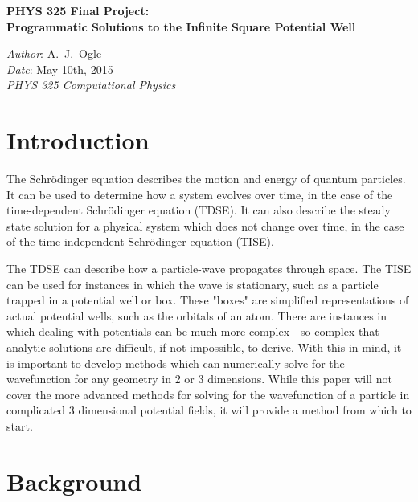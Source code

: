 \documentclass[12pt]{article}                  %
\begin{document}

\begin{center}
{\large \bf{PHYS 325 Final Project:\\
Programmatic Solutions to the Infinite Square Potential Well}}\\
\end{center}
\begin{flushleft}                              %
{\em Author}: A.~J.~Ogle \\                    %
{\em Date}: May 10th, 2015\\
{\em PHYS 325 Computational Physics}\\
\end{flushleft}

\section{Introduction}
	The Schrödinger equation describes the motion and energy of quantum particles. It can be used to determine how a system evolves over time, in the case of the time-dependent Schrödinger equation (TDSE). It can also describe the steady state solution for a physical system which does not change over time, in the case of the time-independent Schrödinger equation (TISE). 
	
The TDSE can describe how a particle-wave propagates through space. The TISE can be used for instances in which the wave is stationary, such as a particle trapped in a potential well or box. These "boxes" are simplified representations of actual potential wells, such as the orbitals of an atom. There are instances in which dealing with potentials can be much more complex - so complex that analytic solutions are difficult, if not impossible, to derive. With this in mind, it is important to develop methods which can numerically solve for the wavefunction for any geometry in 2 or 3 dimensions. While this paper will not cover the more advanced methods for solving for the wavefunction of a particle in complicated 3 dimensional potential fields, it will provide a method from which to start. 

\section{Background}
\end{document}
